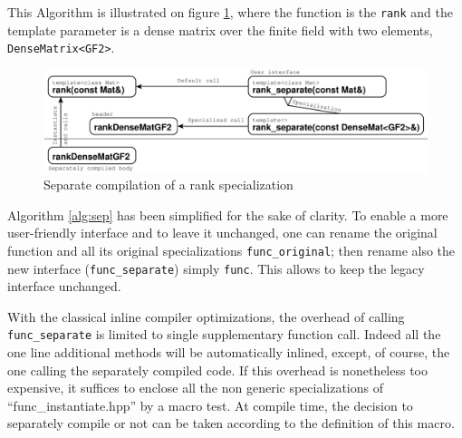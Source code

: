 \documentclass[runningheads,a4paper]{llncs}
\begin{document}
This Algorithm is illustrated on figure \ref{fig:sep}, where
the function is the \texttt{rank} and the template parameter is a dense
matrix over the finite field with two elements,
\texttt{DenseMatrix<GF2>}.
\begin{figure}[ht]
\includegraphics[width=\textwidth]{separate}
\caption{Separate compilation of a rank specialization}\label{fig:sep}
\end{figure}

%
\begin{remark} Algorithm \ref{alg:sep} has been simplified for the
  sake of clarity. To enable a more user-friendly interface and to
  leave it unchanged, one can rename the original function and all its
  original specializations \texttt{func\_original}; then rename also
  the new interface (\texttt{func\_separate}) simply
  \texttt{func}. This allows to keep the legacy
  interface unchanged. 
\end{remark}

\begin{remark} 
With the classical inline compiler optimizations, the overhead of
calling \texttt{func\_separate} is limited to single supplementary
function call. Indeed all the one line additional methods will be
automatically inlined, except, of course, the one calling the separately
compiled code.
If this overhead is nonetheless too expensive, it suffices to enclose all the non generic specializations of
``func\_instantiate.hpp'' by a macro test. 
At compile time, the decision to separately
compile or not can be taken according to the definition of this
macro. 
\end{remark}
\end{document}
